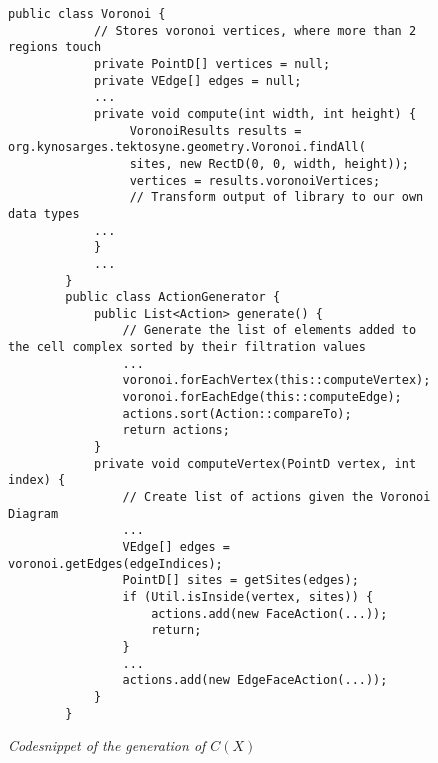 \lstset{language=Java}
\begin{figure}
    \begin{lstlisting}[frame=single]
        public class Voronoi {
            // Stores voronoi vertices, where more than 2 regions touch
            private PointD[] vertices = null;
            private VEdge[] edges = null;
            ...
            private void compute(int width, int height) {
                 VoronoiResults results = org.kynosarges.tektosyne.geometry.Voronoi.findAll(
                 sites, new RectD(0, 0, width, height));
                 vertices = results.voronoiVertices;
                 // Transform output of library to our own data types
            ...
            }
            ...
        }
        public class ActionGenerator {
            public List<Action> generate() {
                // Generate the list of elements added to the cell complex sorted by their filtration values
                ...
                voronoi.forEachVertex(this::computeVertex);
                voronoi.forEachEdge(this::computeEdge);
                actions.sort(Action::compareTo);
                return actions;
            }
            private void computeVertex(PointD vertex, int index) {
                // Create list of actions given the Voronoi Diagram
                ...
                VEdge[] edges = voronoi.getEdges(edgeIndices);
                PointD[] sites = getSites(edges);
                if (Util.isInside(vertex, sites)) {
                    actions.add(new FaceAction(...));
                    return;
                }
                ...
                actions.add(new EdgeFaceAction(...));
            }
        }
    \end{lstlisting}
    \caption{\textit{Codesnippet of the generation of $C(X)$}}
    \label{fig3}
\end{figure}